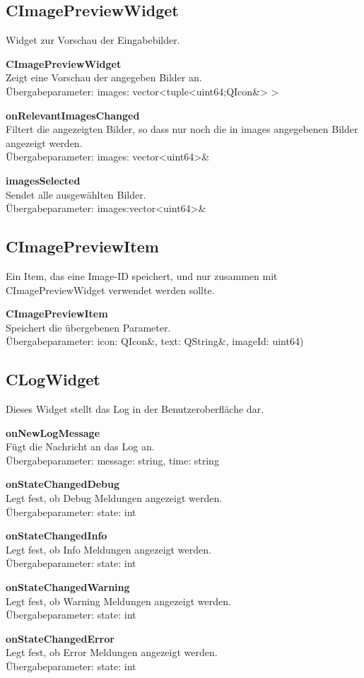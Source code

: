 \subsection{CImagePreviewWidget}
Widget zur Vorschau der Eingabebilder.
\beginMembers
\item \textbf{CImagePreviewWidget} \\Zeigt eine Vorschau der angegeben Bilder an. \\Übergabeparameter: images: vector<tuple<uint64;QIcon\&> >
\closeMembers
\beginSlots
\item \textbf{onRelevantImagesChanged} \\Filtert die angezeigten Bilder, so dass nur noch die in images angegebenen Bilder angezeigt werden. \\Übergabeparameter: images: vector<uint64>\&
\closeMembers
\beginSignals
\item \textbf{imagesSelected} \\Sendet alle ausgewählten Bilder. \\Übergabeparameter: images:vector<uint64>\&
\closeMembers

\subsection{CImagePreviewItem}
Ein Item, das eine Image-ID speichert, und nur zusammen mit CImagePreviewWidget verwendet werden sollte.
\beginMembers
\item \textbf{CImagePreviewItem} \\Speichert die übergebenen Parameter. \\Übergabeparameter:  icon: QIcon\&, text: QString\&, imageId: uint64)
\closeMembers

\subsection{CLogWidget}
Dieses Widget stellt das Log in der Benutzeroberfläche dar.
\beginSlots
\item \textbf{onNewLogMessage} \\Fügt die Nachricht an das Log an. \\Übergabeparameter: message: string, time: string
\item \textbf{onStateChangedDebug} \\Legt fest, ob Debug Meldungen angezeigt werden. \\Übergabeparameter: state: int
\item \textbf{onStateChangedInfo} \\Legt fest, ob Info Meldungen angezeigt werden. \\Übergabeparameter: state: int
\item \textbf{onStateChangedWarning} \\Legt fest, ob Warning Meldungen angezeigt werden. \\Übergabeparameter: state: int
\item \textbf{onStateChangedError} \\Legt fest, ob Error Meldungen angezeigt werden. \\Übergabeparameter: state: int
\closeMembers

